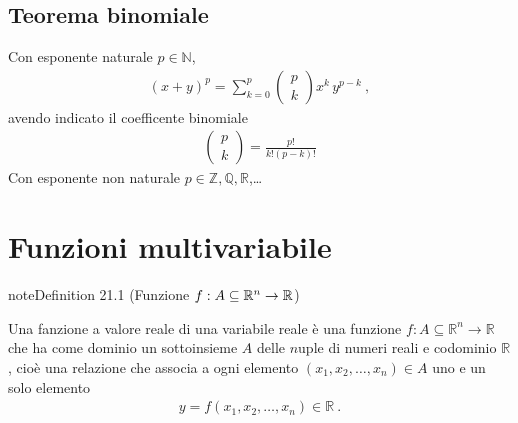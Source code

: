 \documentclass[letterpaper,10pt,italian]{jupyterBook}
\begin{document}
\section{Teorema binomiale}
\label{\detokenize{ch/precalculus/polynomials:teorema-binomiale}}\label{\detokenize{ch/precalculus/polynomials:math-hs-precalculus-polynomials-binomial-thm}}
\sphinxAtStartPar
Con esponente naturale \(p \in \mathbb{N}\),
\begin{equation*}
\begin{split}\left( x + y \right)^p = \sum_{k=0}^{p} \left( \begin{matrix} p \\ k \end{matrix} \right) x^k \, y^{p-k} \ ,\end{split}
\end{equation*}
\sphinxAtStartPar
avendo indicato il coefficente binomiale
\begin{equation*}
\begin{split}\left( \begin{matrix} p \\ k \end{matrix} \right) = \frac{p!}{k! (p-k)!}\end{split}
\end{equation*}
\sphinxAtStartPar
Con esponente non naturale \(p \in \mathbb{Z}, \mathbb{Q}, \mathbb{R}\),… 

\sphinxstepscope




\chapter{Funzioni multi\sphinxhyphen{}variabile}
\label{\detokenize{ch/precalculus/multivariable-real-fun:funzioni-multi-variabile}}\label{\detokenize{ch/precalculus/multivariable-real-fun:math-hs-precalculus-multivariable-real-fun}}\label{\detokenize{ch/precalculus/multivariable-real-fun::doc}}\label{ch/precalculus/multivariable-real-fun:precalculus-multivar-fun}
\begin{sphinxadmonition}{note}{Definition 21.1 (Funzione \protect\(f: A \subseteq \mathbb{R}^n \rightarrow \mathbb{R}\protect\))}



\sphinxAtStartPar
Una fanzione a valore reale di una variabile reale è una funzione \(f: A \subseteq \mathbb{R}^n \rightarrow \mathbb{R}\) che ha come dominio un sottoinsieme \(A\) delle \(n\)\sphinxhyphen{}uple di numeri reali e codominio \(\mathbb{R}\), cioè una relazione che associa a ogni elemento \((x_1, x_2, \dots, x_n) \in A\) uno e un solo elemento
\begin{equation*}
\begin{split}y = f(x_1, x_2, \dots, x_n) \in \mathbb{R} \ .\end{split}
\end{equation*}\end{sphinxadmonition}
\end{document}

